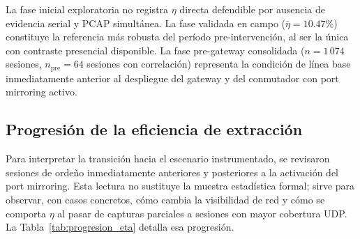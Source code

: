 La fase inicial exploratoria no registra $\eta$ directa defendible por ausencia de evidencia serial y PCAP simultánea. La fase validada en campo ($\bar{\eta}=10.47\%$) constituye la referencia más robusta del período pre-intervención, al ser la única con contraste presencial disponible. La fase pre-gateway consolidada ($n=1\,074$ sesiones, $n_{\text{pre}}=64$ sesiones con correlación) representa la condición de línea base inmediatamente anterior al despliegue del gateway y del conmutador con port mirroring activo.

\subsection{Progresión de la eficiencia de extracción}

Para interpretar la transición hacia el escenario instrumentado, se revisaron sesiones de ordeño inmediatamente anteriores y posteriores a la activación del port mirroring. Esta lectura no sustituye la muestra estadística formal; sirve para observar, con casos concretos, cómo cambia la visibilidad de red y cómo se comporta $\eta$ al pasar de capturas parciales a sesiones con mayor cobertura \ac{UDP}. La Tabla~\ref{tab:progresion_eta} detalla esa progresión.

